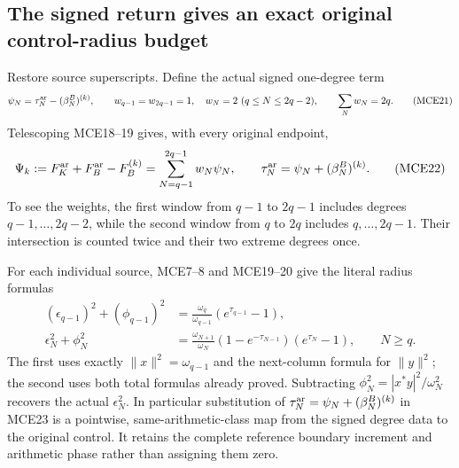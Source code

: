 \documentclass[11pt,a4paper]{article}
\begin{document}
\subsection{The signed return gives an exact original control-radius budget}
Restore source superscripts. Define the actual signed one-degree term
\[
 \psi_N=\tau_N^{\rm ar}-(\beta_N^B)^{(k)},\qquad
 w_{q-1}=w_{2q-1}=1,\quad w_N=2\ (q\le N\le2q-2),
 \qquad\sum_Nw_N=2q.
 \tag{MCE21}
\]
Telescoping MCE18--19 gives, with every original endpoint,
\[
 \Psi_k:=F_K^{\rm ar}+F_B^{\rm ar}-F_B^{(k)}
       =\sum_{N=q-1}^{2q-1}w_N\psi_N,
 \qquad \tau_N^{\rm ar}=\psi_N+(\beta_N^B)^{(k)}.
 \tag{MCE22}
\]
To see the weights, the first window from $q-1$ to $2q-1$
includes degrees $q-1,\ldots,2q-2$, while the second window
from $q$ to $2q$ includes $q,\ldots,2q-1$. Their intersection
is counted twice and their two extreme degrees once.

For each individual source, MCE7--8 and MCE19--20 give the literal
radius formulas
\[
 \begin{split}
 (\epsilon_{q-1})^2+(\phi_{q-1})^2
    &=\frac{\omega_q}{\omega_{q-1}}(e^{\tau_{q-1}}-1),\\
 \epsilon_N^2+\phi_N^2
    &=\frac{\omega_{N+1}}{\omega_N}
       (1-e^{-\tau_{N-1}})(e^{\tau_N}-1),\qquad N\ge q.
 \end{split}\tag{MCE23}
\]
The first uses exactly $\|x\|^2=\omega_{q-1}$ and the next-column
formula for $\|y\|^2$; the second uses both total formulas already
proved. Subtracting $\phi_N^2=|x^*y|^2/\omega_N^2$ recovers the
actual $\epsilon_N^2$. In particular substitution of
$\tau_N^{\rm ar}=\psi_N+(\beta_N^B)^{(k)}$ in MCE23 is a
pointwise, same-arithmetic-class map from the signed degree data to
the original control. It retains the complete reference boundary
increment and arithmetic phase rather than assigning them zero.
\end{document}
